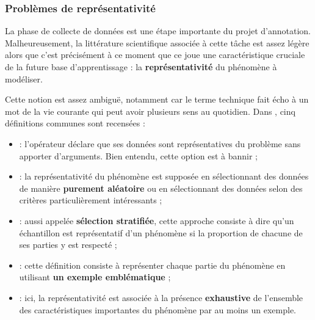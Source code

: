		
		\subsubsection{Problèmes de représentativité}
		\label{section:2.3.1.A-DEFIS-ANNOTATION-ASPECT-DONNEES-REPRESENTATIVITE}
			
			La phase de collecte de données est une étape importante du projet d'annotation.
			Malheureusement, la littérature scientifique associée à cette tâche est assez légère alors que c'est précisément à ce moment que ce joue une caractéristique cruciale de la future base d'apprentissage : la \textbf{représentativité} du phénomène à modéliser.
			
			Cette notion est assez ambiguë, notamment car le terme technique fait écho à un mot de la vie courante qui peut avoir plusieurs sens au quotidien.
			Dans \cite{kruskal-mosteller:1979:representative-sampling-nonscientific}, cinq définitions communes sont recensées :
			\begin{itemize}
				\item {} : l'opérateur déclare que ses données sont représentatives du problème sans apporter d'arguments. Bien entendu, cette option est à bannir ;
				\item {} : la représentativité du phénomène est supposée en sélectionnant des données de manière \textbf{purement aléatoire} ou en sélectionnant des données selon des critères particulièrement intéressants ; 
				\item {} : aussi appelée \textbf{sélection stratifiée}, cette approche consiste à dire qu'un échantillon est représentatif d'un phénomène si la proportion de chacune de ses parties y est respecté ;
				\item {} : cette définition consiste à représenter chaque partie du phénomène en utilisant \textbf{un exemple emblématique} ;
				\item {} : ici, la représentativité est associée à la présence \textbf{exhaustive} de l'ensemble des caractéristiques importantes du phénomène par au moins un exemple.
			\end{itemize}
			
